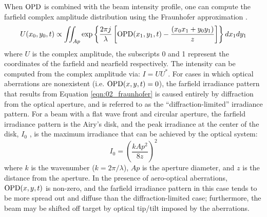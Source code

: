 When $\operatorname{OPD}$ is combined with the beam intensity profile, one can compute the farfield complex amplitude distribution using the Fraunhofer approximation \cite{Goodman-1968-zPUmuuzx}.
\begin{equation}
  U(x_0,y_0,t)\propto\iint_{Ap}\exp\left\{\frac{2\pi j}{\lambda}\left[\operatorname{OPD}(x_1,y_1,t)-\frac{(x_0x_1+y_0y_1)}{z}\right]\right\}dx_1dy_1
  \label{eqn:02_fraunhofer}
\end{equation}
where $U$ is the complex amplitude, the subscripts 0 and 1 represent the coordinates of the farfield and nearfield respectively.
The intensity can be computed from the complex amplitude via: $I = UU^\ast$.
For cases in which optical aberrations are nonexistent (i.e. $\operatorname{OPD}(x,y,t)=0$), the farfield irradiance pattern that results from Equation \ref{eqn:02_fraunhofer} is caused entirely by diffraction from the optical aperture, and is referred to as the “diffraction-limited” irradiance pattern.
For a beam with a flat wave front and circular aperture, the farfield irradiance pattern is the Airy’s disk, and the peak irradiance at the center of the disk, $I_0$ , is the maximum irradiance that can be achieved by the optical system:
\begin{equation}
  I_0 = \left(\frac{kAp^2}{8z}\right)^2
  \label{eqn:02_airy_pattern}
\end{equation}
where $k$ is the wavenumber ($k=2\pi /\lambda$), $Ap$ is the aperture diameter, and $z$ is the distance from the aperture.
In the presence of aero-optical aberrations, $\operatorname{OPD}(x,y,t)$ is non-zero, and the farfield irradiance pattern in this case tends to be more spread out and diffuse than the diffraction-limited case; furthermore, the beam may be shifted off target by optical tip/tilt imposed by the aberrations.

